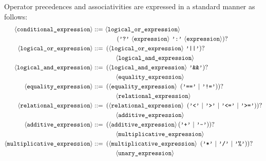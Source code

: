 \documentclass[a4paper, 10pt, draft]{report}
\newcommand{\litQuote}[1]{\textcolor{black}{\texttt{'#1'}}}
\newcommand{\grammarRules}[1]{\small{\singlespacing\vspace{-2em}\begin{align*}#1\end{align*}}}
\newcommand{\bnfNT}[1]{\ensuremath{\mathbf{\left\langle\mbox{\texttt{#1}}\right\rangle}}}
\newcommand{\bnfT}[1]{\ensuremath{\mbox{\litQuote{#1}}}}
\begin{document}
Operator precedences and associativities are expressed in a standard manner as follows:
\grammarRules{
  \bnfNT{conditional\_expression} ::=&\ \bnfNT{logical\_or\_expression}\\
                                     &\qquad \left(\bnfT{?}\ \bnfNT{expression}\ \bnfT{:}\ \bnfNT{expression}\right)? \\
  \bnfNT{logical\_or\_expression} ::=&\ \left(\bnfNT{logical\_or\_expression}\ \bnfT{||}\right)?\\
                                     &\qquad \bnfNT{logical\_and\_expression} \\
  \bnfNT{logical\_and\_expression} ::=&\ \left(\bnfNT{logical\_and\_expression}\ \bnfT{\&\&}\right)?\\
                                      &\qquad \bnfNT{equality\_expression} \\
  \bnfNT{equality\_expression} ::=&\ \left(\bnfNT{equality\_expression}\ \left(\bnfT{==}\ |\ \bnfT{!=} \right)\right)?\\
                                  &\qquad \bnfNT{relational\_expression} \\
  \bnfNT{relational\_expression} ::=&\ \left(\bnfNT{relational\_expression}\ \left(\bnfT{<}\ |\ \bnfT{>}\ |\ \bnfT{<=}\ |\ \bnfT{>=} \right)\right)? \\
                                    &\qquad \bnfNT{additive\_expression} \\
  \bnfNT{additive\_expression} ::=&\ \left(\bnfNT{additive\_expression} \left( \bnfT{+}\ |\ \bnfT{-} \right)\right)?\\
                                  &\qquad \bnfNT{multiplicative\_expression} \\
  \bnfNT{multiplicative\_expression} ::=&\ \left(\bnfNT{multiplicative\_expression}\ \left( \bnfT{*}\ |\ \bnfT{/}\ |\ \bnfT{\%} \right)\right)? \\
                                    &\qquad \bnfNT{unary\_expression} \\
}
\end{document}
